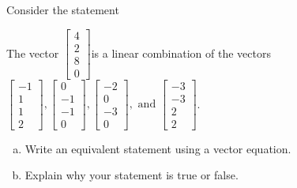 
\begin{exerciseStatement}


Consider the statement 
\begin{center}\begin{minipage}{0.8\textwidth}
 The vector \( \left[\begin{array}{c}
4 \\
2 \\
8 \\
0
\end{array}\right] \)is a linear combination of the vectors \( \left[\begin{array}{c}
-1 \\
1 \\
1 \\
2
\end{array}\right] , \left[\begin{array}{c}
0 \\
-1 \\
-1 \\
0
\end{array}\right] , \left[\begin{array}{c}
-2 \\
0 \\
-3 \\
0
\end{array}\right] , \text{ and } \left[\begin{array}{c}
-3 \\
-3 \\
2 \\
2
\end{array}\right] \). 
\end{minipage}\end{center}
    


\begin{enumerate}[(a)]
\item  Write an equivalent statement using a vector equation.
\item  Explain why your statement is true or false.
\end{enumerate}
    
\end{exerciseStatement}
    
